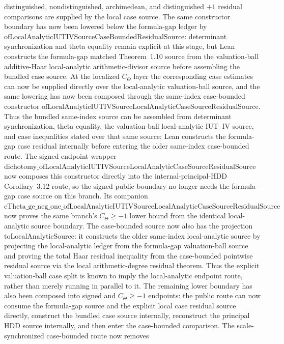 \documentclass[11pt]{article}
\newcommand{\CTheta}{C_\Theta}
\theoremstyle{plain}
\theoremstyle{definition}
\theoremstyle{remark}
\begin{document}
distinguished, nondistinguished, archimedean, and distinguished \(+1\) residual
comparisons are supplied by the local case source.  The same constructor
boundary has now been lowered below the formula-gap ledger by
\(\mathrm{ofLocalAnalyticIUTIVSourceCaseBoundedResidualSource}\): determinant
synchronization and theta equality remain explicit at this stage, but Lean
constructs the formula-gap matched Theorem~1.10 source from the valuation-ball
additive-Haar local-analytic arithmetic-divisor source before assembling the
bundled case source.  At the localized \(C_\Theta\) layer the corresponding
case estimates can now be supplied directly over the local-analytic
valuation-ball source, and the same lowering has now been composed through the
same-index case-bounded constructor
\(\mathrm{ofLocalAnalyticIUTIVSourceLocalAnalyticCaseSourceResidualSource}\).
Thus the bundled same-index source can be assembled from determinant
synchronization, theta equality, the valuation-ball local-analytic IUT~IV
source, and case inequalities stated over that same source; Lean constructs the
formula-gap case residual internally before entering the older same-index
case-bounded route.  The signed endpoint wrapper
\(\mathrm{dichotomy\_ofLocalAnalyticIUTIVSourceLocalAnalyticCaseSourceResidualSource}\)
now composes this constructor directly into the internal-principal-HDD
Corollary~3.12 route, so the signed public boundary no longer needs the
formula-gap case source on this branch.  Its companion
\(\mathrm{cTheta\_ge\_neg\_one\_ofLocalAnalyticIUTIVSourceLocalAnalyticCaseSourceResidualSource}\)
now proves the same branch's \(\CTheta\ge -1\) lower bound from the identical
local-analytic source boundary.  The
case-bounded source now also has the projection
\(\mathrm{toLocalAnalyticSource}\): it constructs the older same-index
local-analytic source by projecting the local-analytic ledger from the
formula-gap valuation-ball source and proving the total Haar residual
inequality from the case-bounded pointwise residual source via the local
arithmetic-degree residual theorem.  Thus the explicit valuation-ball case
split is known to imply the local-analytic endpoint route, rather than merely
running in parallel to it.
The remaining lower boundary has also been composed into signed and
\(\CTheta\ge -1\) endpoints:
the public route can now consume the formula-gap source and the explicit local
case residual source directly, construct the bundled case source internally,
reconstruct the principal HDD source internally, and then enter the
case-bounded comparison.  The scale-synchronized case-bounded route now removes
\end{document}
